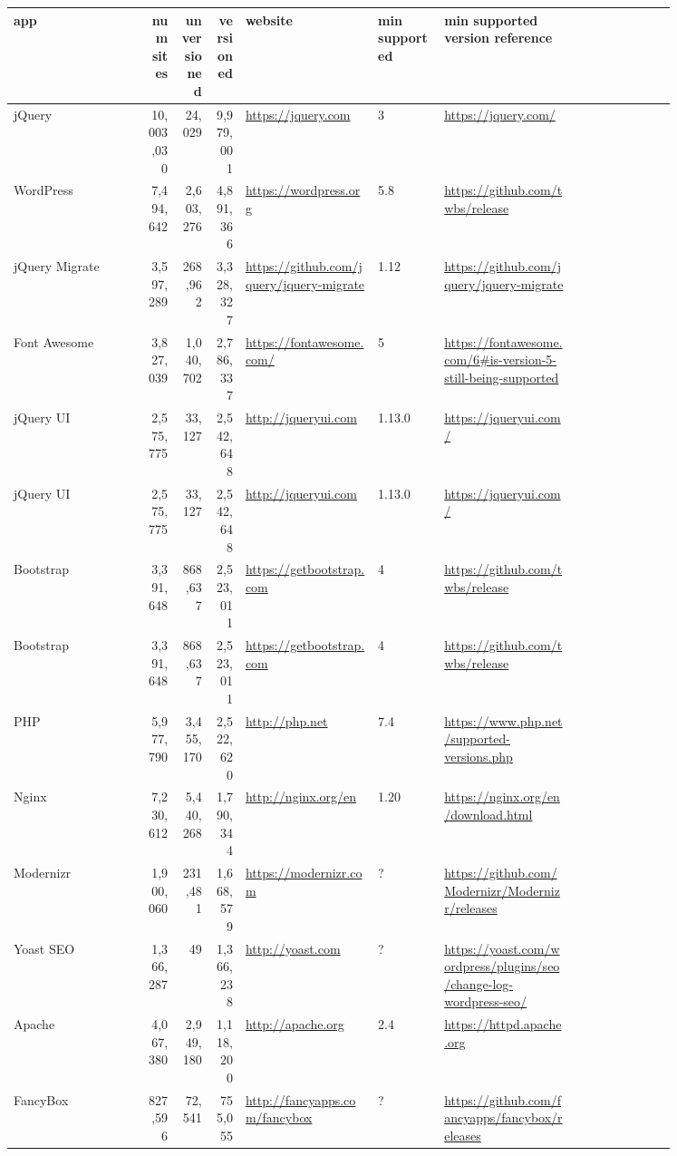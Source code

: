 \setlength\LTleft{-2cm}
\begin{longtable}{|p{0.2\linewidth}|r|r|r|p{0.2\linewidth}|p{0.1\linewidth}|p{0.2\linewidth}|p{0.15\linewidth}|}
	
	\hline
	app &num sites &unversioned  &versioned  &website &min supported
	&min supported version reference \\\hline
	jQuery &10,003,030 &24,029 &9,979,001 &\url{https://jquery.com} &3 &\url{https://jquery.com/} \\
	WordPress &7,494,642 &2,603,276 &4,891,366 &\url{https://wordpress.org} &5.8 &\url{https://github.com/twbs/release} \\
	jQuery Migrate &3,597,289 &268,962 &3,328,327 &\url{https://github.com/jquery/jquery-migrate} &1.12 &\url{https://github.com/jquery/jquery-migrate} \\
	Font Awesome &3,827,039 &1,040,702 &2,786,337 &\url{https://fontawesome.com/} &5 &\url{https://fontawesome.com/6\#is-version-5-still-being-supported} \\
	jQuery UI &2,575,775 &33,127 &2,542,648 &\url{http://jqueryui.com} &1.13.0 &\url{https://jqueryui.com/} \\
	jQuery UI &2,575,775 &33,127 &2,542,648 &\url{http://jqueryui.com} &1.13.0 &\url{https://jqueryui.com/} \\
	Bootstrap &3,391,648 &868,637 &2,523,011 &\url{https://getbootstrap.com} &4 &\url{https://github.com/twbs/release} \\
	Bootstrap &3,391,648 &868,637 &2,523,011 &\url{https://getbootstrap.com} &4 &\url{https://github.com/twbs/release} \\
	PHP &5,977,790 &3,455,170 &2,522,620 &\url{http://php.net} &7.4 &\url{https://www.php.net/supported-versions.php} \\
	Nginx &7,230,612 &5,440,268 &1,790,344 &\url{http://nginx.org/en} &1.20 &\url{https://nginx.org/en/download.html} \\
	Modernizr &1,900,060 &231,481 &1,668,579 &\url{https://modernizr.com} &? &\url{https://github.com/Modernizr/Modernizr/releases} \\
	Yoast SEO &1,366,287 &49 &1,366,238 &\url{http://yoast.com} &? &\url{https://yoast.com/wordpress/plugins/seo/change-log-wordpress-seo/} \\
	Apache &4,067,380 &2,949,180 &1,118,200 &\url{http://apache.org} &2.4 &\url{https://httpd.apache.org} \\
	FancyBox &827,596 &72,541 &755,055 &\url{http://fancyapps.com/fancybox} &? &\url{https://github.com/fancyapps/fancybox/releases} \\

\end{longtable}

